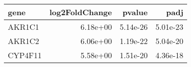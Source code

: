 \begin{tabular}{lrrr}
\toprule
   gene &  log2FoldChange &   pvalue &     padj \\
\midrule
 AKR1C1 &        6.18e+00 & 5.14e-26 & 5.01e-23 \\
 AKR1C2 &        6.06e+00 & 1.19e-22 & 5.04e-20 \\
CYP4F11 &        5.58e+00 & 1.51e-20 & 4.36e-18 \\
\bottomrule
\end{tabular}
